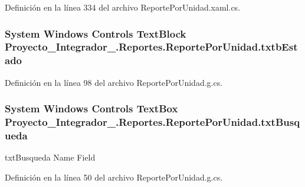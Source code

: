 Definición en la línea 334 del archivo Reporte\-Por\-Unidad.\-xaml.\-cs.

\hypertarget{class_proyecto___integrador__3_1_1_reportes_1_1_reporte_por_unidad_ab7c8420e279514d7fcf295a15f77c9d4}{
\subsubsection[{txtb\-Estado}]{\setlength{\rightskip}{0pt plus 5cm}System Windows Controls Text\-Block Proyecto\-\_\-\-Integrador\-\_.\-Reportes.\-Reporte\-Por\-Unidad.\-txtb\-Estado\hspace{0.3cm}{\ttfamily [package]}}}\label{class_proyecto___integrador__3_1_1_reportes_1_1_reporte_por_unidad_ab7c8420e279514d7fcf295a15f77c9d4}


Definición en la línea 98 del archivo Reporte\-Por\-Unidad.\-g.\-cs.

\hypertarget{class_proyecto___integrador__3_1_1_reportes_1_1_reporte_por_unidad_a0a6db8ee110ce078b4507f464c026fda}{
\subsubsection[{txt\-Busqueda}]{\setlength{\rightskip}{0pt plus 5cm}System Windows Controls Text\-Box Proyecto\-\_\-\-Integrador\-\_.\-Reportes.\-Reporte\-Por\-Unidad.\-txt\-Busqueda}}\label{class_proyecto___integrador__3_1_1_reportes_1_1_reporte_por_unidad_a0a6db8ee110ce078b4507f464c026fda}


txt\-Busqueda Name Field 



Definición en la línea 50 del archivo Reporte\-Por\-Unidad.\-g.\-cs.



